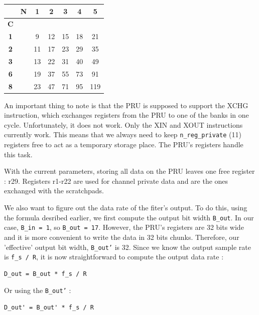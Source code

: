\documentclass[]{report}
\begin{document}
\begin {table}[H]
\begin{center}
\begin{tabular}{|c|c|c|c|c|c|c|}
	\hline  & \textbf{N} & \textbf{1} & \textbf{2} & \textbf{3} & \textbf{4} & \textbf{5} \\ 
	\hline \textbf{C} & & & & & & \\ 
	\hline  \textbf{1} & & 9 & 12 & 15 & 18 & 21 \\ 
	\hline \textbf{2} & & 11 & 17 & 23 & 29 & 35 \\ 
	\hline  \textbf{3} & & 13 & 22 & 31 & 40 & 49  \\ 
	\hline \textbf{6} & & 19 & 37 & 55 & 73 & 91 \\ 
	\hline \textbf{8} & & 23 & 47 & 71 & 95 & 119  \\ 
	\hline 
\end{tabular} 
\end{center}
\end {table}


An important thing to note is that the PRU is supposed to support the
XCHG instruction, which exchanges registers from the PRU to one of the
banks in one cycle. Unfortunately, it does not work. Only the XIN and
XOUT instructions currently work. This means that we always need to keep
\texttt{n\_reg\_private} (11) registers free to act as a temporary
storage place. The PRU's registers handle this task.

With the current parameters, storing all data on the PRU leaves one free
register : r29. Registers r1-r22 are used for channel private data and
are the ones exchanged with the scratchpads.

We also want to figure out the data rate of the fiter's output. To do
this, using the formula desribed earlier, we first compute the output
bit width \texttt{B\_out}. In our case, \texttt{B\_in\ =\ 1}, so
\texttt{B\_out\ =\ 17}. However, the PRU's registers are 32 bits wide
and it is more convenient to write the data in 32 bits chunks.
Therefore, our 'effective' output bit width,
\texttt{B\_out'} is 32. Since we know the output sample
rate is \texttt{f\_s\ /\ R}, it is now straightforward to compute the
output data rate :

\begin{verbatim}
D_out = B_out * f_s / R
\end{verbatim}

\noindent Or using the \texttt{B\_out'} :

\begin{verbatim}
D_out' = B_out' * f_s / R
\end{verbatim}
\end{document}
